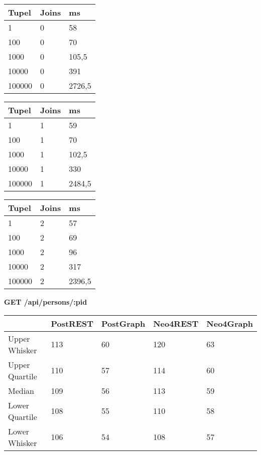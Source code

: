 \begin{table}[H]
\centering
\begin{subtable}[t]{0.3\textwidth}
\centering
\begin{tabular}{|l|l|l|}
\hline
Tupel  & Joins & ms    \\ \hline
1      & 0     & 58  \\ \hline
100    & 0     & 70   \\ \hline
1000   & 0     & 105,5   \\ \hline
10000  & 0     & 391   \\ \hline
100000 & 0     &  2726,5\\ \hline
\end{tabular}
\end{subtable}%
\hfill
\begin{subtable}[t]{0.3\textwidth}
\centering
\begin{tabular}{|l|l|l|}
\hline
Tupel  & Joins & ms    \\ \hline
1      & 1     & 59   \\ \hline
100    & 1     & 70   \\ \hline
1000   & 1     & 102,5   \\ \hline
10000  & 1     & 330 \\ \hline
100000 & 1     & 2484,5   \\ \hline
\end{tabular}
\end{subtable}%
\hfill
\begin{subtable}[t]{0.3\textwidth}
\centering
\begin{tabular}{|l|l|l|}
\hline
Tupel  & Joins & ms    \\ \hline
1      & 2     & 57   \\ \hline
100    & 2     & 69 \\ \hline
1000   & 2     & 96   \\ \hline
10000  & 2     & 317   \\ \hline
100000 & 2     & 2396,5 \\ \hline
\end{tabular}
\end{subtable}
\end{table}
\noindent
\textbf{GET /api/persons/:pid}
\begin{table}[H]
\begin{tabular}{|l|l|l|l|l|}
\hline
               & PostREST & PostGraph & Neo4REST & Neo4Graph \\ \hline
Upper Whisker  & 113      & 60        & 120      & 63        \\ \hline
Upper Quartile & 110      & 57        & 114      & 60        \\ \hline
Median         & 109      & 56        & 113      & 59        \\ \hline
Lower Quartile & 108      & 55        & 110      & 58        \\ \hline
Lower Whisker  & 106      & 54        & 108      & 57        \\ \hline
\end{tabular}
\end{table}
